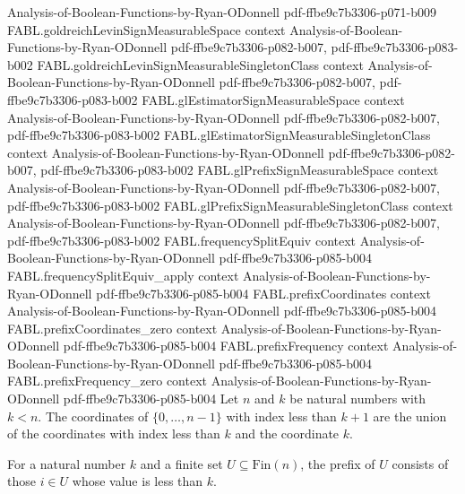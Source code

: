 \begin{theorem}
  {Analysis-of-Boolean-Functions-by-Ryan-ODonnell}
  {pdf-ffbe9c7b3306-p071-b009}
\proofstep
  {FABL.goldreichLevinSignMeasurableSpace}
  {context}
  {Analysis-of-Boolean-Functions-by-Ryan-ODonnell}
  {pdf-ffbe9c7b3306-p082-b007,
    pdf-ffbe9c7b3306-p083-b002}
\proofstep
  {FABL.goldreichLevinSignMeasurableSingletonClass}
  {context}
  {Analysis-of-Boolean-Functions-by-Ryan-ODonnell}
  {pdf-ffbe9c7b3306-p082-b007,
    pdf-ffbe9c7b3306-p083-b002}
\proofstep
  {FABL.glEstimatorSignMeasurableSpace}
  {context}
  {Analysis-of-Boolean-Functions-by-Ryan-ODonnell}
  {pdf-ffbe9c7b3306-p082-b007,
    pdf-ffbe9c7b3306-p083-b002}
\proofstep
  {FABL.glEstimatorSignMeasurableSingletonClass}
  {context}
  {Analysis-of-Boolean-Functions-by-Ryan-ODonnell}
  {pdf-ffbe9c7b3306-p082-b007,
    pdf-ffbe9c7b3306-p083-b002}
\proofstep
  {FABL.glPrefixSignMeasurableSpace}
  {context}
  {Analysis-of-Boolean-Functions-by-Ryan-ODonnell}
  {pdf-ffbe9c7b3306-p082-b007,
    pdf-ffbe9c7b3306-p083-b002}
\proofstep
  {FABL.glPrefixSignMeasurableSingletonClass}
  {context}
  {Analysis-of-Boolean-Functions-by-Ryan-ODonnell}
  {pdf-ffbe9c7b3306-p082-b007,
    pdf-ffbe9c7b3306-p083-b002}
\proofstep
  {FABL.frequencySplitEquiv}
  {context}
  {Analysis-of-Boolean-Functions-by-Ryan-ODonnell}
  {pdf-ffbe9c7b3306-p085-b004}
\proofstep
  {FABL.frequencySplitEquiv_apply}
  {context}
  {Analysis-of-Boolean-Functions-by-Ryan-ODonnell}
  {pdf-ffbe9c7b3306-p085-b004}
\proofstep
  {FABL.prefixCoordinates}
  {context}
  {Analysis-of-Boolean-Functions-by-Ryan-ODonnell}
  {pdf-ffbe9c7b3306-p085-b004}
\proofstep
  {FABL.prefixCoordinates_zero}
  {context}
  {Analysis-of-Boolean-Functions-by-Ryan-ODonnell}
  {pdf-ffbe9c7b3306-p085-b004}
\proofstep
  {FABL.prefixFrequency}
  {context}
  {Analysis-of-Boolean-Functions-by-Ryan-ODonnell}
  {pdf-ffbe9c7b3306-p085-b004}
\proofstep
  {FABL.prefixFrequency_zero}
  {context}
  {Analysis-of-Boolean-Functions-by-Ryan-ODonnell}
  {pdf-ffbe9c7b3306-p085-b004}
Let $n$ and $k$ be natural numbers with $k<n$. The coordinates of $\{0,\ldots,n-1\}$
with index less than $k+1$ are the union of the coordinates with index less than $k$ and
the coordinate $k$.
\end{theorem}

\begin{definition}
\label{FABL.prefixFrequency}
\leanok
For a natural number $k$ and a finite set $U\subseteq\mathrm{Fin}(n)$, the prefix of $U$
consists of those $i\in U$ whose value is less than $k$.
\end{definition}

